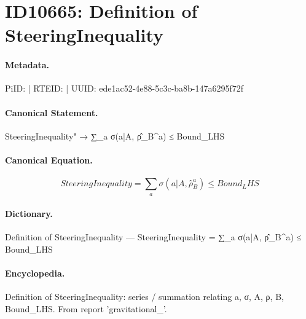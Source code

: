 \section*{ID10665: Definition of SteeringInequality}
\paragraph{Metadata.}
PiID:  | RTEID:  | UUID: ede1ac52-4e88-5c3c-ba8b-147a6295f72f

\paragraph{Canonical Statement.}
SteeringInequality" → ∑\_a σ(a|A, ρ̂\_B\textasciicircum{}a) ≤ Bound\_LHS

\paragraph{Canonical Equation.}
\[
SteeringInequality = ∑_a σ(a|A, ρ̂_B^a) ≤ Bound_LHS
\]

\paragraph{Dictionary.}
Definition of SteeringInequality — SteeringInequality = ∑\_a σ(a|A, ρ̂\_B\textasciicircum{}a) ≤ Bound\_LHS

\paragraph{Encyclopedia.}
Definition of SteeringInequality: series / summation relating a, σ, A, ρ, B, Bound\_LHS. From report 'gravitational\_'.
